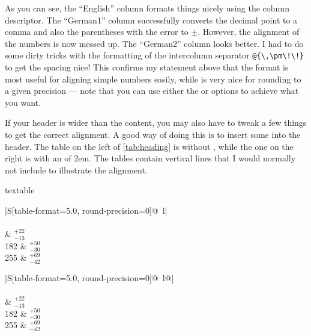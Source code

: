 As you can see, the \enquote{English} column formats things nicely using
the  column descriptor. The \enquote{German1} column successfully
converts the decimal point to a comma and also the parentheses with
the error to \(\pm\). However, the alignment of the numbers is now
messed up. The \enquote{German2} column looks better. I had to do some dirty
tricks with the formatting of the intercolumn separator
\verb+@{\,\pm\!\!}+ to get the spacing nice! This confirms my
statement above that the  format is most useful for aligning
simple numbers easily, while  is very nice for rounding to
a given precision --- note that you can use either the  or
 options to achieve what you want.

If your header is wider than the content,
you may also have to tweak a few things to get the correct alignment.
A good way of doing this is to insert some  into the header.
The table on the left of \cref{tab:heading} is without , while the one on the right is
with an  of 2em.
The tables contain vertical lines that I would normally not include to illustrate the alignment.

\begin{table}[htbp]
  \caption{Table illustrating how to centre numbers
    if the heading is wider than them.}
  \label{tab:heading}
\begin{tcblisting}{textable}
\renewcommand{\arraystretch}{1.4}
\centering
\begin{tabular}{|S[table-format=5.0, round-precision=0]@{\,} l|}
  \toprule
   \\
   \\
   & \(^{+22}_{-13}\) \\
    182 & \(^{+50}_{-30}\) \\
    255 & \(^{+69}_{-42}\) \\
  \bottomrule
\end{tabular}
\qquad
\begin{tabular}{|S[table-format=5.0, round-precision=0]@{\,}
  l@{\hspace*{2em}}|}
  \toprule
   \\
   \\
   & \(^{+22}_{-13}\) \\
    182 & \(^{+50}_{-30}\) \\
    255 & \(^{+69}_{-42}\) \\
  \bottomrule
\end{tabular}
\end{tcblisting}
\end{table}

